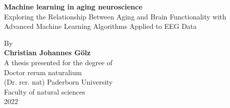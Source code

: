 \begin{titlepage}
    \begin{center}
        \vspace*{1cm}
        \Huge
        \textbf{Machine learning in aging neuroscience}\\
        \vspace{0.5cm}
        \Large
        Exploring the Relationship Between Aging and Brain Functionality with Advanced Machine Learning Algorithms Applied to EEG Data
                        
        \vspace{1.5cm}
        \LARGE
        By\\
        \vspace{0.5cm}
        \textbf{Christian Johannes Gölz\\}
        \vspace{0.5cm}       
        A thesis presented for the degree of\\
        Doctor rerum naturalium\\
        (Dr. rer. nat)
        \vfill
        \Large
        Paderborn University\\
        Faculty of natural sciences\\
        2022
            
    \end{center}
\end{titlepage}

